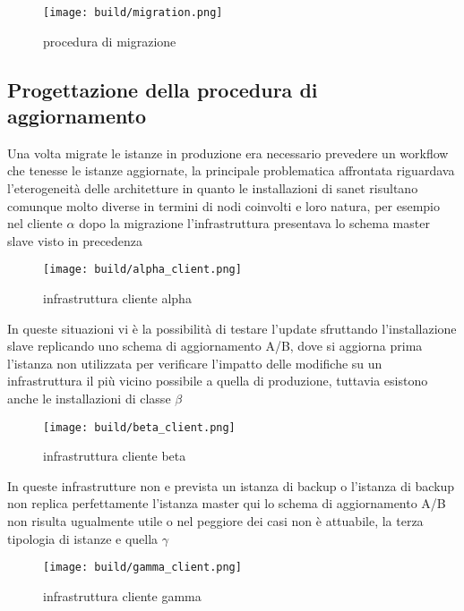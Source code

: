 \begin{figure}[H]
    \centering
    \texttt{[image: build/migration.png]}
    \caption{procedura di migrazione}
    \label{fig:migration}
\end{figure}

\subsection{Progettazione della procedura di aggiornamento}
Una volta migrate le istanze in produzione era necessario prevedere un workflow che tenesse le istanze aggiornate, la principale problematica affrontata riguardava l'eterogeneità delle architetture in quanto le installazioni di sanet risultano comunque molto diverse in termini di nodi coinvolti e loro natura, per esempio nel cliente \(\alpha\) dopo la migrazione l'infrastruttura presentava lo schema master slave visto in precedenza

\begin{figure}[H]
    \centering
    \texttt{[image: build/alpha\_client.png]}
    \caption{infrastruttura cliente alpha}
    \label{fig:alpha_client}
\end{figure}

In queste situazioni vi è la possibilità di testare l'update sfruttando l'installazione slave replicando uno schema di aggiornamento A/B, dove si aggiorna prima l'istanza non utilizzata per verificare l'impatto delle modifiche su un infrastruttura il più vicino possibile a quella di produzione, tuttavia esistono anche le installazioni di classe \(\beta\)

\begin{figure}[H]
    \centering
    \texttt{[image: build/beta\_client.png]}
    \caption{infrastruttura cliente beta}
    \label{fig:beta_client}
\end{figure}

In queste infrastrutture non e prevista un istanza di backup o l'istanza di backup non replica perfettamente l'istanza master qui lo schema di aggiornamento A/B non risulta ugualmente utile o nel peggiore dei casi non è attuabile, la terza tipologia di istanze e quella \(\gamma\)

\begin{figure}[H]
    \centering
    \texttt{[image: build/gamma\_client.png]}
    \caption{infrastruttura cliente gamma}
    \label{fig:gamma_client}
\end{figure}

